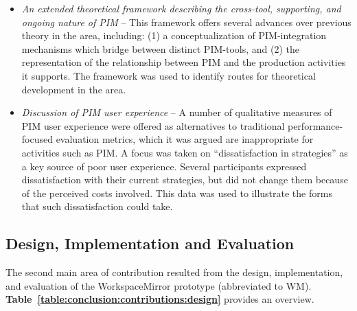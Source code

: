 \begin{itemize}

\item \textit{An extended theoretical framework describing the cross-tool, supporting, and ongoing nature of PIM} --  This framework offers several advances over previous theory in the area, including: (1) a conceptualization of PIM-integration mechanisms which bridge between distinct PIM-tools, and (2) the representation of the relationship between PIM and the production activities it supports.  The framework was used to identify routes for theoretical development in the area.

\item \textit{Discussion of PIM user experience} -- A number of qualitative measures of PIM user experience were offered as alternatives to traditional performance-focused evaluation metrics, which it was argued are inappropriate for activities such as PIM.  A focus was taken on ``dissatisfaction in strategies'' as a key source of poor user experience. Several participants expressed dissatisfaction with their current strategies, but did not change them because of the perceived costs involved.  This data was used to illustrate the forms that such dissatisfaction could take.  


\end{itemize}


\subsection{Design, Implementation and Evaluation}
\label{conclusion:contributions:design}

The second main area of contribution resulted from the design, implementation, and evaluation of the WorkspaceMirror prototype (abbreviated to WM).  \textbf{Table~\ref{table:conclusion:contributions:design}} provides an overview.


